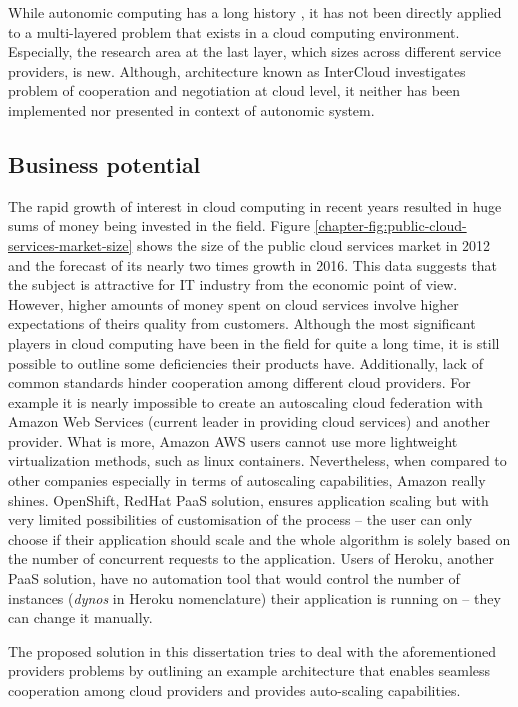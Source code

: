 While autonomic computing has a long history \cite{Mu04}, it has not been directly applied to a multi-layered problem that exists in a cloud computing environment. Especially, the research area at the last layer, which sizes across different service providers, is new. Although, architecture known as InterCloud \cite{BuRaCa10} investigates problem of cooperation and negotiation at cloud level, it neither has been implemented nor presented in context of autonomic system.

\subsection{Business potential}
The rapid growth of interest in cloud computing in recent years resulted in huge sums of money being invested in the field. Figure \ref{chapter-fig:public-cloud-services-market-size} shows the size of the public cloud services market in 2012 and the forecast of its nearly two times growth in 2016. This data suggests that the subject is attractive for IT industry from the economic point of view. However, higher amounts of money spent on cloud services involve higher expectations of theirs quality from customers. Although the most significant players in cloud computing have been in the field for quite a long time, it is still possible to outline some deficiencies their products have. Additionally, lack of common standards hinder cooperation among different cloud providers. For example it is nearly impossible to create an autoscaling cloud federation with Amazon Web Services (current leader in providing cloud services\cite{GartnerMagicQuadrantSep2013}) and another provider. What is more, Amazon AWS users cannot use more lightweight virtualization methods, such as linux containers. Nevertheless, when compared to other companies especially in terms of autoscaling capabilities, Amazon really shines. OpenShift, RedHat PaaS solution, ensures application scaling but with very limited possibilities of customisation of the process -- the user can only choose if their application should scale and the whole algorithm is solely based on the number of concurrent requests to the application. Users of Heroku, another PaaS solution, have no automation tool that would control the number of instances (\emph{dynos} in Heroku nomenclature) their application is running on -- they can change it manually.

The proposed solution in this dissertation tries to deal with the aforementioned providers problems by outlining an example architecture that enables seamless cooperation among cloud providers and provides auto-scaling capabilities.

